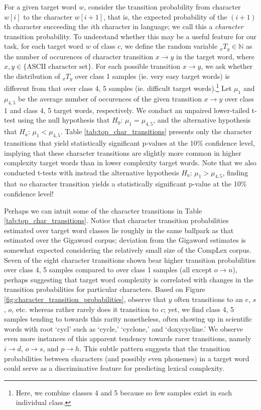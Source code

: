 \documentclass{dcthesis}
\theoremstyle{definition}
\theoremstyle{remark}
\begin{document}
For a given target word $w$, consider the transition probability from character $w[i]$ to the character $w[i+1]$, that is, the expected probability of the $(i+1)$th character succeeding the $i$th character in language; we call this a \textit{character} transition probability. To understand whether this may be a useful feature for our task, for each target word $w$ of class $c$, we define the random variable ${}_xT_y \in \mathbb{N}$ as the number of occurences of character transition $x \rightarrow y$ in the target word, where $x, y \in \{\text{ASCII character set}\}$. For each possible transition $x \rightarrow y$, we ask whether the distribution of ${}_xT_y$ over class 1 samples (ie. very easy target words) is different from that over class 4, 5 samples (ie. difficult target words).\footnote{Here, we combine classes 4 and 5 because so few samples exist in each individual class.} Let $\mu_1$ and $\mu_{4,5}$ be the average number of occurences of the given transition $x \rightarrow y$ over  class 1 and class 4, 5 target words, respectively. We conduct an unpaired lower-tailed t-test using the null hypothesis that $H_0\text{: } \mu_1 = \mu_{4,5}$, and the alternative hypothesis that $H_a\text{: } \mu_1 < \mu_{4,5}$. Table \ref{tab:top_char_transitions} presents only the character transitions that yield statistically significant p-values at the 10\% confidence level, implying that these character transitions are slightly more common in higher complexity target words than in lower complexity target words. Note that we also conducted t-tests with instead the alternative hypothesis $H_a\text{: } \mu_1 > \mu_{4,5}$, finding that \textit{no} character transition yields a statistically significant p-value at the 10\% confidence level! 

Perhaps we can intuit some of the character transitions in Table \ref{tab:top_char_transitions}. Notice that character transition probabilities estimated over target word classes lie roughly in the same ballpark as that estimated over the Gigaword corpus; deviation from the Gigaword estimates is somewhat expected considering the relatively small size of the CompLex corpus. Seven of the eight character transitions shown bear higher transition probabilities over class 4, 5 samples compared to over class 1 samples (all except $o \rightarrow n$), perhaps suggesting that target word complexity is correlated with changes in the transition probabilities for particular characters. Based on Figure \ref{fig:character_transition_probabilities}, observe that $y$ often transitions to an $e$, $s$, $o$, etc. whereas rather rarely does it transition to $c$; yet, we find class 4, 5 samples tending to towards this rarity nonetheless, often showing up in scientific words with root `cycl' such as `cycle,' `cyclone,' and `doxycycline.' We observe even more instances of this apparent tendency towards rarer transitions, namely $i \rightarrow d$, $o \rightarrow s$, and $p \rightarrow h$. This subtle pattern suggests that the transition probabilities between characters (and possibly even phonemes) in a target word could serve as a discriminative feature for predicting lexical complexity.
\end{document}
